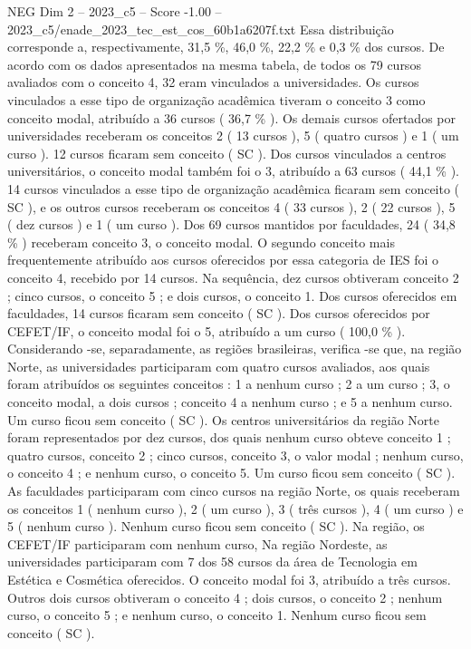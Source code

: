 \begin{textsample}{NEG Dim 2 – 2023\_c5 – Score -1.00 – 2023\_c5/enade\_2023\_tec\_est\_cos\_60b1a6207f.txt}
Essa distribuição corresponde a, respectivamente, 31,5 \%, 46,0 \%, 22,2 \% e 0,3 \% dos cursos.
De acordo com os dados apresentados na mesma tabela, de todos os 79 cursos avaliados com o conceito 4, 32 eram vinculados a universidades.
Os cursos vinculados a esse tipo de organização acadêmica tiveram o conceito 3 como conceito modal, atribuído a 36 cursos ( 36,7 \% ).
Os demais cursos ofertados por universidades receberam os conceitos 2 ( 13 cursos ), 5 ( quatro cursos ) e 1 ( um curso ). 12 cursos ficaram sem conceito ( SC ).
Dos cursos vinculados a centros universitários, o conceito modal também foi o 3, atribuído a 63 cursos ( 44,1 \% ). 14 cursos vinculados a esse tipo de organização acadêmica ficaram sem conceito ( SC ), e os outros cursos receberam os conceitos 4 ( 33 cursos ), 2 ( 22 cursos ), 5 ( dez cursos ) e 1 ( um curso ).
Dos 69 cursos mantidos por faculdades, 24 ( 34,8 \% ) receberam conceito 3, o conceito modal.
O segundo conceito mais frequentemente atribuído aos cursos oferecidos por essa categoria de IES foi o conceito 4, recebido por 14 cursos.
Na sequência, dez cursos obtiveram conceito 2 ; cinco cursos, o conceito 5 ; e dois cursos, o conceito 1.
Dos cursos oferecidos em faculdades, 14 cursos ficaram sem conceito ( SC ).
Dos cursos oferecidos por CEFET/IF, o conceito modal foi o 5, atribuído a um curso ( 100,0 \% ).
Considerando -se, separadamente, as regiões brasileiras, verifica -se que, na região Norte, as universidades participaram com quatro cursos avaliados, aos quais foram atribuídos os seguintes conceitos : 1 a nenhum curso ; 2 a um curso ; 3, o conceito modal, a dois cursos ; conceito 4 a nenhum curso ; e 5 a nenhum curso.
Um curso ficou sem conceito ( SC ).
Os centros universitários da região Norte foram representados por dez cursos, dos quais nenhum curso obteve conceito 1 ; quatro cursos, conceito 2 ; cinco cursos, conceito 3, o valor modal ; nenhum curso, o conceito 4 ; e nenhum curso, o conceito 5.
Um curso ficou sem conceito ( SC ).
As faculdades participaram com cinco cursos na região Norte, os quais receberam os conceitos 1 ( nenhum curso ), 2 ( um curso ), 3 ( três cursos ), 4 ( um curso ) e 5 ( nenhum curso ).
Nenhum curso ficou sem conceito ( SC ).
Na região, os CEFET/IF participaram com nenhum curso, Na região Nordeste, as universidades participaram com 7 dos 58 cursos da área de Tecnologia em Estética e Cosmética oferecidos.
O conceito modal foi 3, atribuído a três cursos.
Outros dois cursos obtiveram o conceito 4 ; dois cursos, o conceito 2 ; nenhum curso, o conceito 5 ; e nenhum curso, o conceito 1.
Nenhum curso ficou sem conceito ( SC ).

\end{textsample}
